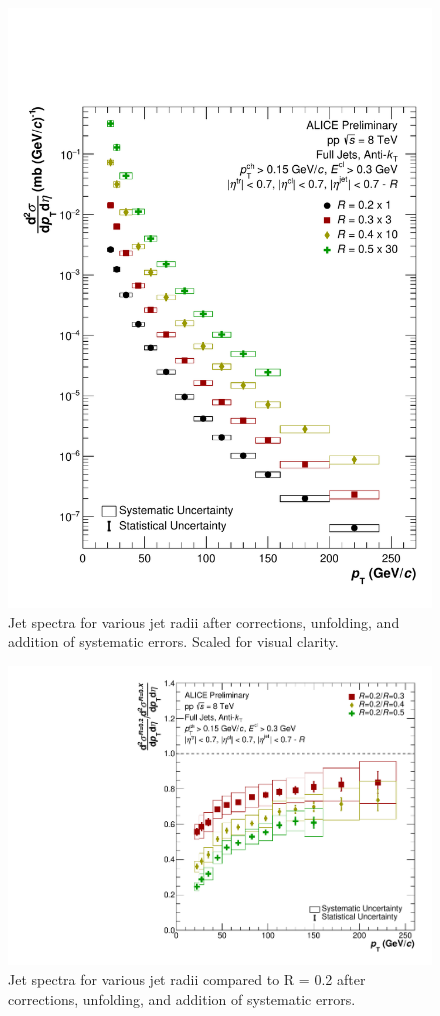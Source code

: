\documentclass[ALICE]{ALICE_analysis_notes}
\begin{document}
\begin{figure}
    \centering
    \includegraphics[width=15cm]{figures/FinalResults/Bayes_reg6.pdf}
    \caption{Jet spectra for various jet radii after corrections, unfolding, and addition of systematic errors. Scaled for visual clarity.}
    \label{fig:finalSpectra}
\end{figure}

\begin{figure}
    \centering
    \includegraphics[width=15cm]{figures/FinalResults/Bayes_reg6_Ratio.pdf}
    \caption{Jet spectra for various jet radii compared to R = 0.2 after corrections, unfolding, and addition of systematic errors.}
    \label{fig:finalSpectraRatios}
\end{figure}
\end{document}
